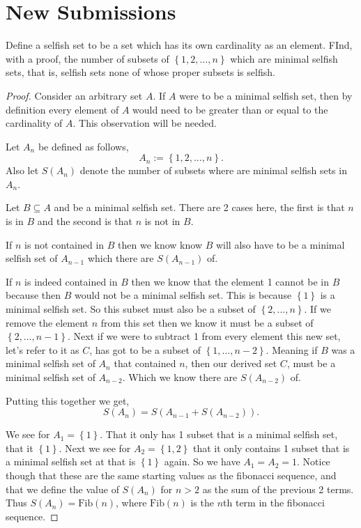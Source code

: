 \documentclass[11pt]{article}
\newenvironment{problem}[2][Problem\!]{\begin{trivlist}
\item[\hskip \labelsep {\bfseries #1}\hskip \labelsep {\bfseries #2}]}{\end{trivlist}}
\newcommand{\set}[1]{\left\{#1\right\}} %
\begin{document}
\section{New Submissions}
\begin{tcolorbox}
    \begin{problem}{ IC | 11/05 | 124. (Putnam)}
        Define a selfish set to be a set which has its own cardinality as an element. FInd, with a proof, the number of subsets of $\set{1,2,\dots, n}$ which are minimal selfish sets, that is, selfish sets none of whose proper subsets is selfish. 
    \end{problem}
\end{tcolorbox}
\begin{proof}
    Consider an arbitrary set $A$. If $A$ were to be a minimal selfish set, then by definition every element of $A$ would need to be greater than or equal to the cardinality of $A$. This observation will be needed. 

    Let $A_n$ be defined as follows,
    \[A_n := \set{1,2,\dots, n}.\]
    Also let $S(A_n)$ denote the number of subsets where are minimal selfish sets in $A_n$.


    Let $B \subseteq A$ and be a minimal selfish set. There are 2 cases here, the first is that $n$ is in $B$ and the second is that $n$ is not in $B$.
    
    If $n$ is not contained in $B$ then we know know $B$ will also have to be a minimal selfish set of $A_{n-1}$ which there are $S(A_{n-1})$ of. 

    If $n$ is indeed contained in $B$ then we know that the element 1 cannot be in $B$ because then $B$ would not be a minimal selfish set. This is because $\set{1}$ is a minimal selfish set. So this subset must also be a subset of $\set{2, \dots, n}$. If we remove the element $n$ from this set then we know it must be a subset of $\set{2, \dots, n-1}$. Next if we were to subtract 1 from every element this new set, let's refer to it as $C$, has got to be a subset of $\set{1,\dots,n-2}$. Meaning if $B$ was a minimal selfish set of $A_n$ that contained $n$, then our derived set $C$, must be a minimal selfish set of $A_{n-2}$. Which we know there are $S(A_{n-2})$ of. 
    
    Putting this together we get,
    \[S(A_n) = S(A_{n-1} + S(A_{n-2})).\]

    We see for $A_1 = \set{1}$. That it only has 1 subset that is a minimal selfish set, that it $\set{1}$. Next we see for $A_2 = \set{1,2}$ that it only contains 1 subset that is a minimal selfish set at that is $\set{1}$ again. So we have $A_1 = A_2 = 1$. Notice though that these are the same starting values as the fibonacci sequence, and that we define the value of $S(A_n)$ for $n > 2$ as the sum of the previous 2 terms. Thus $S(A_n) = \text{Fib}(n)$, where $\text{Fib}(n)$ is the $n$th term in the fibonacci sequence. 
\end{proof}
\end{document}
